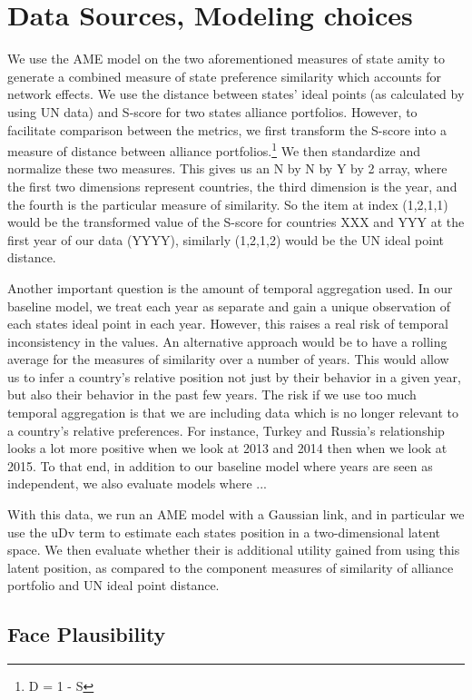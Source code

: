 \section*{Data Sources, Modeling choices}

We use the AME model on the two aforementioned measures of state amity to generate a combined measure of state preference similarity which accounts for network effects. We use the distance between states' ideal points (as calculated by \citet{bailey:etal:2015} using UN data) and S-score for two states alliance portfolios. However, to facilitate comparison between the metrics, we first transform the S-score into a measure of distance between alliance portfolios.\footnote{D = 1 - S} We then standardize and normalize these two measures. This gives us an N by N by Y by 2 array, where the first two dimensions represent countries, the third dimension is the year, and the fourth is the particular measure of similarity. So the item at index (1,2,1,1) would be the transformed value of the S-score for countries XXX and YYY at the first year of our data (YYYY), similarly (1,2,1,2) would be the UN ideal point distance.

Another important question is the amount of temporal aggregation used. In our baseline model, we treat each year as separate and gain a unique observation of each states ideal point in each year. However, this raises a real risk of temporal inconsistency in the values. An alternative approach would be to have a rolling average for the measures of similarity over a number of years. This would allow us to infer a country's relative position not just by their behavior in a given year, but also their behavior in the past few years. The risk if we use too much temporal aggregation is that we are including data which is no longer relevant to a country's relative preferences. For instance, Turkey and Russia's relationship looks a lot more positive when we look at 2013 and 2014 then when we look at 2015. To that end, in addition to our baseline model where years are seen as independent, we also evaluate models where ... 

With this data, we run an AME model with a Gaussian link, and in particular we use the uDv term to estimate each states position in a two-dimensional latent space. We then evaluate whether their is additional utility gained from using this latent position, as compared to the component measures of similarity of alliance portfolio and UN ideal point distance.

\subsection*{Face Plausibility}

